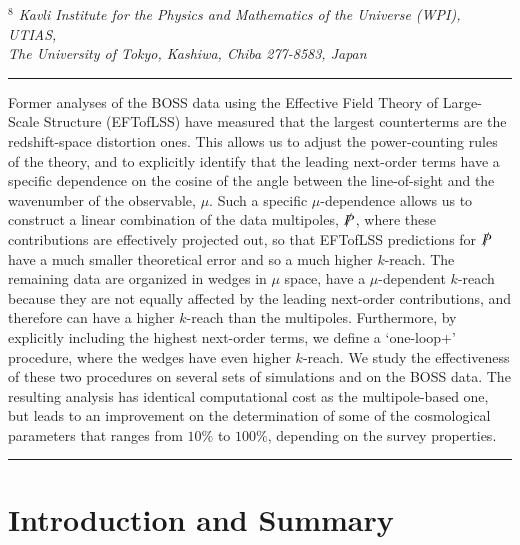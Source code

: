 \documentclass[12pt,a4paper]{article}
\def\PA{\slashed{P}}
\renewcommand{\(}{\left(}
\renewcommand{\)}{\right)}
\begin{document}
\begin{center}
{\normalsize { \sl $^{8}$ Kavli Institute for the Physics and Mathematics of the Universe (WPI), UTIAS, \\
The University of Tokyo, Kashiwa, Chiba 277-8583, Japan }}\\
\vspace{.3cm}



\end{center}


\hrule \vspace{0.3cm}
{\small \noindent 
Former analyses of the BOSS data using the Effective Field Theory of Large-Scale Structure {(EFTofLSS)} have measured that the largest counterterms are the redshift-space distortion ones. This allows us to adjust the power-counting rules of the theory, and to explicitly identify that the leading next-order terms have a specific dependence on the {cosine of the} angle between the line-of-sight and the wavenumber of the observable, $\mu$. Such a specific $\mu$-dependence allows us to construct a linear combination of the data multipoles, $\PA$, where these contributions are effectively projected out, so that EFTofLSS predictions for $\PA$ have a much smaller theoretical error and so a much higher $k$-reach. The remaining data are organized in wedges in $\mu$ space, have a $\mu$-dependent $k$-reach because they are not equally affected by the leading next-order contributions, and therefore can have a higher $k$-reach than the multipoles. Furthermore, by explicitly including the highest next-order terms, we define a `one-loop+'  procedure, where the wedges have even higher $k$-reach. We study the effectiveness of these two procedures on several sets of simulations and on the BOSS data. The resulting analysis has identical computational cost as the multipole-based one, but leads to an improvement on the determination of some of the cosmological parameters that ranges from $10\%$ to $100\%$, depending on the survey properties.

\vspace{0.3cm}} 
\hrule





 

%
\newpage

\tableofcontents

\section{Introduction and Summary\label{sec:intro}}
\end{document}
